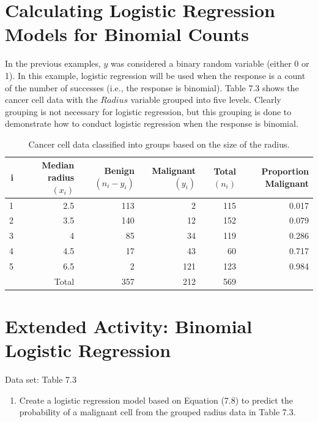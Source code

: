\documentclass[
]{report}
\providecommand{\tightlist}{%
  \setlength{\itemsep}{0pt}\setlength{\parskip}{0pt}}
\begin{document}
\hypertarget{calculating-logistic-regression-models-for-binomial-counts-1}{%
\section{Calculating Logistic Regression Models for Binomial Counts}\label{calculating-logistic-regression-models-for-binomial-counts-1}}

In the previous examples, \(y\) was considered a binary random variable (either 0 or 1). In this example, logistic regression will be used when the response is a count of the number of successes (i.e., the response is binomial). Table 7.3 shows the cancer cell data with the \(Radius\) variable grouped into five levels. Clearly grouping is not necessary for logistic regression, but this grouping is done to demonstrate how to conduct logistic regression when the response is binomial.

\begin{table}[!h]
\centering
\caption{\label{tab:table3}Cancer cell data classified into groups based on the size of the radius.}
\centering
\begin{tabular}[t]{rrrrrr}
\toprule
i & Median radius $(x_i)$ & Benign $(n_i - y_i)$ & Malignant $(y_i)$ & Total $(n_i)$ & Proportion Malignant\\
\midrule
1 & 2.5 & 113 & 2 & 115 & 0.017\\
2 & 3.5 & 140 & 12 & 152 & 0.079\\
3 & 4 & 85 & 34 & 119 & 0.286\\
4 & 4.5 & 17 & 43 & 60 & 0.717\\
5 & 6.5 & 2 & 121 & 123 & 0.984\\
\addlinespace
 & Total & 357 & 212 & 569 & \\
\bottomrule
\end{tabular}
\end{table}

\hypertarget{extended-activity-binomial-logistic-regression-1}{%
\section*{Extended Activity: Binomial Logistic Regression}\label{extended-activity-binomial-logistic-regression-1}}

Data set: Table 7.3

\begin{enumerate}
\def\labelenumi{\arabic{enumi}.}
\setcounter{enumi}{25}
\tightlist
\item
  Create a logistic regression model based on Equation (7.8) to predict the probability of a malignant cell from the grouped radius data in Table 7.3.\\
\end{enumerate}
\end{document}
